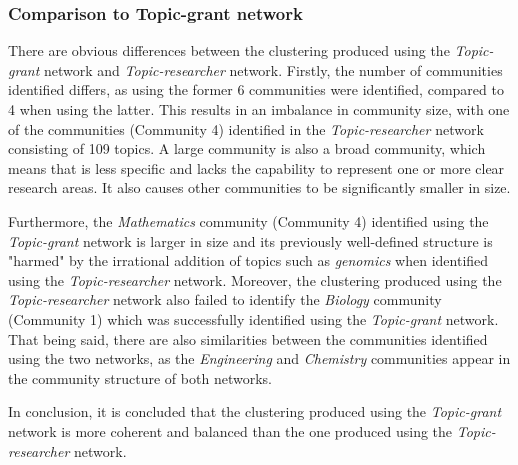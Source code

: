\subsubsection{Comparison to Topic-grant network}

There are obvious differences between the clustering produced using the \textit{Topic-grant} network and \textit{Topic-researcher} network. Firstly, the number of communities identified differs, as using the former 6 communities were identified, compared to 4 when using the latter. This results in an imbalance in community size, with one of the communities (Community 4) identified in the \textit{Topic-researcher} network consisting of 109 topics. A large community is also a broad community, which means that is less specific and lacks the capability to represent one or more clear research areas. It also causes other communities to be significantly smaller in size.

\clearpage

Furthermore, the \textit{Mathematics} community (Community 4) identified using the \textit{Topic-grant} network is larger in size and its previously well-defined structure is "harmed" by the irrational addition of topics such as \textit{genomics} when identified  using the \textit{Topic-researcher} network. Moreover, the clustering produced using the \textit{Topic-researcher} network also failed to identify the \textit{Biology} community (Community 1) which was successfully identified using the \textit{Topic-grant} network. That being said, there are also similarities between the communities identified using the two networks, as the \textit{Engineering} and \textit{Chemistry} communities appear in the community structure of both networks.

In conclusion, it is concluded that the clustering produced using the \textit{Topic-grant} network is more coherent and balanced than the one produced using the \textit{Topic-researcher} network.